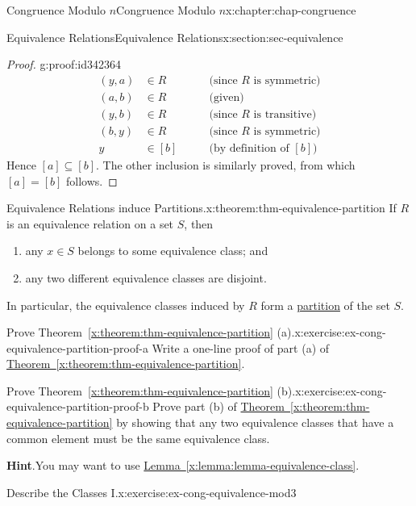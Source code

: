 \documentclass[oneside,10pt,]{book}
\newcommand{\blocktitlefont}{\relax}
\newcommand{\xreffont}{\relax}
\numberwithin{equation}{section}
\newcommand{\amp}{&}
\begin{document}
\begin{chapterptx}{Congruence Modulo \(n\)}{}{Congruence Modulo \(n\)}{}{}{x:chapter:chap-congruence}
\begin{sectionptx}{Equivalence Relations}{}{Equivalence Relations}{}{}{x:section:sec-equivalence}
\begin{proof}{}{g:proof:id342364}
\begin{align*}
(y,a) \amp \in R \qquad \amp \text{(since $R$ is symmetric)}\\
(a,b) \amp \in R \qquad \amp \text{(given)}\\
(y,b) \amp \in R \qquad \amp \text{(since $R$ is transitive)}\\
(b,y) \amp \in R \qquad \amp \text{(since $R$ is symmetric)}\\
y \amp \in [b] \qquad \amp \text{(by definition of $[b]$)}
\end{align*}
Hence \([a] \subseteq [b]\). The other inclusion is similarly proved, from which \([a] = [b]\) follows.%
\end{proof}
\begin{theorem}{Equivalence Relations induce Partitions.}{}{x:theorem:thm-equivalence-partition}%
If \(R\) is an equivalence relation on a set \(S\), then%
\begin{enumerate}[label=(\alph*)]
\item{}any \(x \in S\) belongs to some equivalence class; and%
\item{}any two different equivalence classes are disjoint.%
\end{enumerate}
In particular, the equivalence classes induced by \(R\) form a \hyperref[x:definition:def-partition]{partition} of the set \(S\).%
\end{theorem}
\begin{inlineexercise}{Prove Theorem~{\xreffont\ref*{x:theorem:thm-equivalence-partition}} (a).}{x:exercise:ex-cong-equivalence-partition-proof-a}%
Write a one-line proof of part (a) of \hyperref[x:theorem:thm-equivalence-partition]{Theorem~{\xreffont\ref{x:theorem:thm-equivalence-partition}}}.%
\end{inlineexercise}
\begin{inlineexercise}{Prove Theorem~{\xreffont\ref*{x:theorem:thm-equivalence-partition}} (b).}{x:exercise:ex-cong-equivalence-partition-proof-b}%
Prove part (b) of \hyperref[x:theorem:thm-equivalence-partition]{Theorem~{\xreffont\ref{x:theorem:thm-equivalence-partition}}} by showing that any two equivalence classes that have a common element must be the same equivalence class.%
\par\smallskip%
\noindent\textbf{\blocktitlefont Hint}.\hypertarget{g:hint:id341608}{}\quad{}You may want to use \hyperref[x:lemma:lemma-equivalence-class]{Lemma~{\xreffont\ref{x:lemma:lemma-equivalence-class}}}.%
\end{inlineexercise}
\begin{inlineexercise}{Describe the Classes I.}{x:exercise:ex-cong-equivalence-mod3}%

\end{inlineexercise}
\end{sectionptx}
\end{chapterptx}
\end{document}
